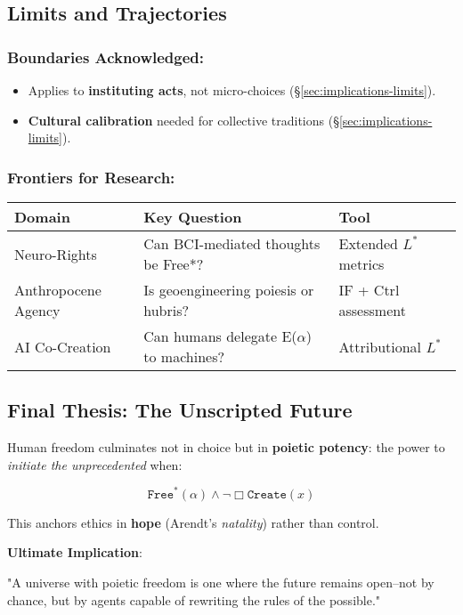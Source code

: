 \documentclass[11pt,a4paper]{article}
\begin{document}
\subsection{Limits and Trajectories}

\subsubsection{Boundaries Acknowledged:}

\begin{itemize}
  \item Applies to \textbf{instituting acts}, not micro-choices (\S\ref{sec:implications-limits}).
  \item \textbf{Cultural calibration} needed for collective traditions (\S\ref{sec:implications-limits}).
\end{itemize}

\subsubsection{Frontiers for Research:}

\begin{tabular}{l l l}
\hline
\textbf{Domain} & \textbf{Key Question} & \textbf{Tool} \\
\hline
Neuro-Rights & Can BCI-mediated thoughts be Free*? & Extended \(L^{*}\) metrics \\
Anthropocene Agency & Is geoengineering poiesis or hubris? & IF + Ctrl assessment \\
AI Co-Creation & Can humans delegate E(\(\alpha\)) to machines? & Attributional \(L^{*}\) \\
\hline
\end{tabular}

\subsection{Final Thesis: The Unscripted Future}

Human freedom culminates not in choice but in \textbf{poietic potency}: the power to \emph{initiate the unprecedented} when:

\[
\texttt{Free}^{*}(\alpha)\wedge\neg\Box\texttt{Create}(x)
\]

This anchors ethics in \textbf{hope} (Arendt's \emph{natality}) rather than control.

\textbf{Ultimate Implication}:

"A universe with poietic freedom is one where the future remains open--not by chance, but by agents capable of rewriting the rules of the possible." \cite[ p. 201]{shapiro2024}
\end{document}

